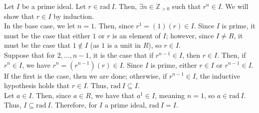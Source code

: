\documentclass[8pt]{extarticle}
\newcommand{\Z}{\mathbb{Z}}
\begin{document}
  Let $I$ be a prime ideal. Let $r\in \text{rad}~I$. Then, $\exists n\in \Z_{>0}$ such that $r^{n} \in I$. We will show that $r\in I$ by induction.\\

  In the base case, we let $n = 1$. Then, since $r^{1} = (1)(r) \in I$. Since $I$ is prime, it must be the case that either $1$ or $r$ is an element of $I$; however, since $I \neq R$, it must be the case that $1\notin I$ (as $1$ is a unit in $R$), so $r\in I$.\\

  Suppose that for $2,\dots,n-1$, it is the case that if $r^{n-1}\in I$, then $r\in I$. Then, if $r^{n}\in I$, we have $r^{n} = (r^{n-1})(r)\in I$. Since $I$ is prime, either $r\in I$ or $r^{n-1}\in I$. If the first is the case, then we are done; otherwise, if $r^{n-1}\in I$, the inductive hypothesis holds that $r\in I$. Thus, $\text{rad}~I \subseteq I$.\\

  Let $a\in I$. Then, since $a \in R$, we have that $a^{1}\in I$, meaning $n=1$, so $a\in \text{rad}~I$. Thus, $I\subseteq \text{rad}~I$. Therefore, for $I$ a prime ideal, $\text{rad}~I = I$.
\end{document}
